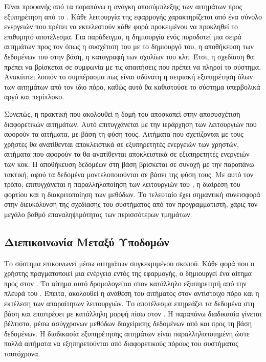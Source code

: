 Είναι προφανής από τα παραπάνω η ανάγκη αποσύμπλεξης των αιτημάτων προς εξυπηρέτηση από το . Κάθε λειτουργία της εφαρμογής χαρακτηρίζεται από ένα σύνολο ενεργειών που πρέπει να εκτελεστούν κάθε φορά προκειμένου να προκληθεί το επιθυμητό αποτέλεσμα. Για παράδειγμα, η δημιουργία ενός  πυροδοτεί μια σειρά αιτημάτων προς τον  όπως η συσχέτιση του  με το δημιουργό του, η αποθήκευση των δεδομένων του  στην βάση, η καταγραφή των σχολίων του  κλπ. Έτσι, η σχεδίαση θα πρέπει να βρίσκεται σε συμφωνία με τις απαιτήσεις που πρέπει να πληροί το σύστημα. Ανακύπτει λοιπόν το συμπέρασμα πως είναι αδύνατη η σειριακή εξυπηρέτηση όλων των αιτημάτων από τον ίδιο πόρο, καθώς αυτό θα καθιστούσε το σύστημα υπερβολικά αργό και περίπλοκο.

Συνεπώς, η πρακτική που ακολουθεί η δομή του  αποσκοπεί στην αποσυσχέτιση διαφορετικών αιτημάτων. Αυτό επιτυγχάνεται με την ιεράρχηση των λειτουργιών που αφορούν τα αιτήματα, με βάση τη φύση τους. Αιτήματα που σχετίζονται με τους χρήστες θα ανατίθενται αποκλειστικά σε εξυπηρετητές ενεργειών των χρηστών, αιτήματα που αφορούν τα  θα ανατίθενται αποκλειστικά σε εξυπηρετητές ενεργειών των  κοκ. Η αποθήκευση δεδομέων στη βάση βρίσκεται σε συνοχή με την παραπάνω τακτική, αφού τα δεδομένα μοντελοποιούνται σε  βάσει της φύση τους.  Με αυτό τον τρόπο, επιτυγχάνεται η παραλληλοποίηση των λειτουργιών του , η διαίρεση του φορτίου και η διακριτοποίηση των μεθόδων. Το τελευταίο έχει σημαντική συνεισφορά στην διευκόλυνση της σχεδίασης του συστήματος από τον προγραμματιστή, χάρις τον μεγάλο βαθμό επαναληψιμότητας των περισσότερων τμημάτων. 


\subsection{Διεπικοινωνία Μεταξύ Υποδομών}
Το σύστημα  επικοινωνεί μέσω αιτημάτων συγκεκριμένου σκοπού. Κάθε φορά που ο χρήστης πραγματοποιεί μια ενέργεια εντός της εφαρμογής, ο  δημιουργεί ένα αίτημα προς στον . Το αίτημα αυτό δρομολογείται στον κατάλληλο εξυπηρετητή από την πλευρά του . Έπειτα, ακολουθεί η ανάθεση του αιτήματος στον αντίστοιχο πόρο και η εκτέλεση των απαραίτητων λειτουργιών. Το αποτέλεσμα επηρεάζει τα δεδομένα στη βάση και επιστρέφει με κατάλληλη μορφή πίσω στον . Η παραπάνω διαδικασία γίνεται βέλτιστα, μέσω ασύγχρονων μεθόδων διαχείρισης δεδομένων από και προς τη βάση δεδομένων. Η διαδικασία εξυπηρέτησης αιτημάτων είναι παραλληλοποιημένη ώστε πολλά αιτήματα να εξηπηρετούνται από διαφορετικούς πόρους του συστήματος ταυτόχρονα.









